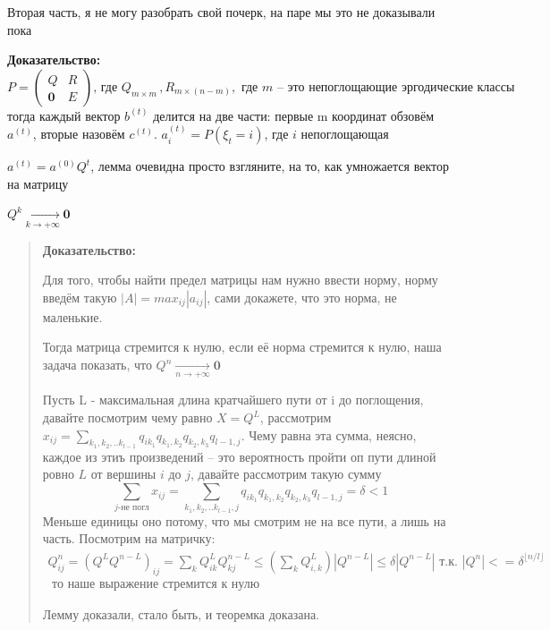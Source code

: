      Вторая часть, я не могу разобрать свой почерк, на паре мы это не доказывали пока
    
     \textbf{Доказательство:}
\[
P = 
\left(
\begin{array}{c|c}
    Q & R \\ \hline
    \mathbf{0} & E
\end{array}
\right)
\text{, где } Q_{m \times m} \,, R_{m \times (n -m)}, \text{ где } m \text{ -- это непоглощающие эргодические классы }
\]
тогда каждый вектор $b^{(t)}$ делится на две части: первые m координат обзовём $a^{(t)}$, вторые назовём  $c^{(t)}$. $a_i^{(t)} = P(\xi_t = i)$, где $i$ непоглощающая

$a^{(t)} = a^{(0)}Q^t$, лемма очевидна просто взгляните, на то, как умножается вектор на матрицу

$Q^k \xrightarrow[k\rightarrow+\infty]{}\mathbf{0}$
\begin{quote}
    
     \textbf{Доказательство:}
     
     Для того, чтобы найти предел матрицы нам нужно ввести норму, норму введём такую
     $|A| = max_{ij}|a_{ij}|$, сами докажете, что это норма, не маленькие.

     Тогда матрица стремится к нулю, если её норма стремится к нулю, наша задача показать, что 
     $Q^n \xrightarrow[n\rightarrow +\infty]{} \mathbf{0}$

     Пусть L - максимальная длина кратчайшего пути от i до поглощения, давайте посмотрим чему равно 
     $X = Q^L$, рассмотрим $x_{ij} = \sum_{k_1, k_2, .. k_{l - 1}}q_{ik_1}q_{k_1, k_2}q_{k_2, k_3} q_{l-1, j}$. Чему равна эта сумма, неясно, каждое из этиъ произведений -- это вероятность пройти оп пути длиной ровно $L$ от вершины $i$ до $j$, давайте рассмотрим такую сумму $$\sum_{j\text{-не погл}}x_{ij} = \sum_{k_1, k_2, .. k_{l - 1}, j}q_{ik_1}q_{k_1, k_2}q_{k_2, k_3} q_{l-1, j} = \delta < 1$$
     Меньше единицы оно потому, что мы смотрим не на все пути, а лишь на часть. Посмотрим на матричку:
     \begin{multline*}
     \displaystyle Q_{ij}^n =(Q^L Q^{n-L})_{ij} = \sum_k Q^L_{ik}Q_{kj}^{n-L} \leq (\sum_k Q_{i, k}^L)|Q^{n - L}| \leq \delta|Q^{n - L}| \text{ т.к. } |Q^{n}| <= \delta^{\lfloor n/l \rfloor}
     \\ \text{ то наше выражение стремится к нулю}
     \end{multline*}

     Лемму доказали, стало быть, и теоремка доказана.
\end{quote}




